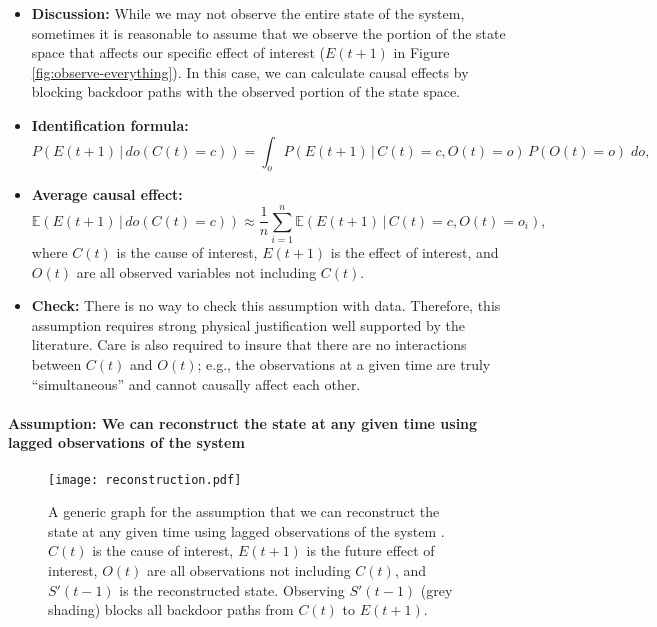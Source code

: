 \documentclass[12pt]{article}
\begin{document}
\begin{itemize}
\item \textbf{Discussion:} While we may not observe the entire state
  of the system, sometimes it is reasonable to assume that we observe
  the portion of the state space that affects our specific effect of
  interest ($E(t+1)$ in Figure \ref{fig:observe-everything}). In this
  case, we can calculate causal effects by blocking backdoor paths
  with the observed portion of the state space.
\item \textbf{Identification formula:}
  \begin{equation*}
    P(E(t+1) \, | \, do(C(t) = c)) = \int_{o} P(E(t+1) \, | \, C(t) = c,
    O(t) = o) \, P(O(t)=o) \; d o,
  \end{equation*}
\item \textbf{Average causal effect:}
  \begin{equation*}
    \mathbb{E}(E(t+1) \, | \, do(C(t) = c)) \approx \frac{1}{n}
    \sum_{i=1}^n \mathbb{E}(E(t+1) \, | \, C(t)=c, O(t)=o_i),
  \end{equation*}
  where $C(t)$ is the cause of interest, $E(t+1)$ is the effect of
  interest, and $O(t)$ are all observed variables not including $C(t)$.
\item \textbf{Check:} There is no way to check this assumption with
  data. Therefore, this assumption requires strong physical
  justification well supported by the literature. Care is also
  required to insure that there are no interactions between $C(t)$ and
  $O(t)$; e.g., the observations at a given time are truly
  ``simultaneous'' and cannot causally affect each other.
\end{itemize}

\newpage

\paragraph{Assumption: We can reconstruct the state at any given time
  using lagged observations of the system}

\begin{figure}[H]
  \centering
  \texttt{[image: reconstruction.pdf]}
  \caption{A generic graph for the assumption that we can reconstruct
    the state at any given time using lagged observations of the
    system \citep{takens1981detecting}. $C(t)$ is the cause of
    interest, $E(t+1)$ is the future effect of interest, $O(t)$ are
    all observations not including $C(t)$, and $S'(t-1)$ is the
    reconstructed state. Observing $S'(t-1)$ (grey shading) blocks all
    backdoor paths from $C(t)$ to $E(t+1)$.}
  \label{fig:reconstruction}
\end{figure}
\end{document}
